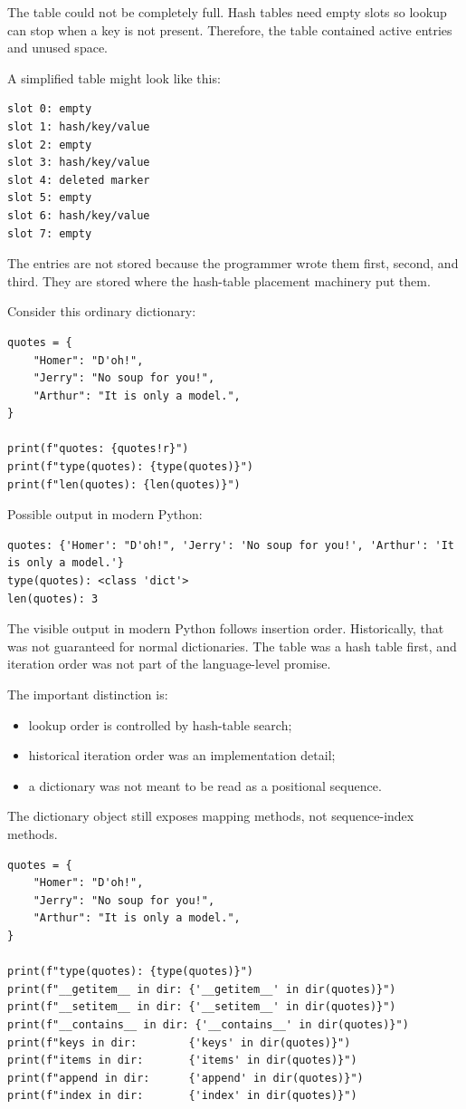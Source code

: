 The table could not be completely full. Hash tables need empty slots so lookup can stop when a key is not present. Therefore, the table contained active entries and unused space.

A simplified table might look like this:

\begin{verbatim}
slot 0: empty
slot 1: hash/key/value
slot 2: empty
slot 3: hash/key/value
slot 4: deleted marker
slot 5: empty
slot 6: hash/key/value
slot 7: empty
\end{verbatim}

The entries are not stored because the programmer wrote them first, second, and third. They are stored where the hash-table placement machinery put them.

Consider this ordinary dictionary:

\begin{verbatim}
quotes = {
    "Homer": "D'oh!",
    "Jerry": "No soup for you!",
    "Arthur": "It is only a model.",
}

print(f"quotes: {quotes!r}")
print(f"type(quotes): {type(quotes)}")
print(f"len(quotes): {len(quotes)}")
\end{verbatim}

Possible output in modern Python:

\begin{verbatim}
quotes: {'Homer': "D'oh!", 'Jerry': 'No soup for you!', 'Arthur': 'It is only a model.'}
type(quotes): <class 'dict'>
len(quotes): 3
\end{verbatim}

The visible output in modern Python follows insertion order. Historically, that was not guaranteed for normal dictionaries. The table was a hash table first, and iteration order was not part of the language-level promise.

The important distinction is:

\begin{itemize}
    \item lookup order is controlled by hash-table search;
    \item historical iteration order was an implementation detail;
    \item a dictionary was not meant to be read as a positional sequence.
\end{itemize}

The dictionary object still exposes mapping methods, not sequence-index methods.

\begin{verbatim}
quotes = {
    "Homer": "D'oh!",
    "Jerry": "No soup for you!",
    "Arthur": "It is only a model.",
}

print(f"type(quotes): {type(quotes)}")
print(f"__getitem__ in dir: {'__getitem__' in dir(quotes)}")
print(f"__setitem__ in dir: {'__setitem__' in dir(quotes)}")
print(f"__contains__ in dir: {'__contains__' in dir(quotes)}")
print(f"keys in dir:        {'keys' in dir(quotes)}")
print(f"items in dir:       {'items' in dir(quotes)}")
print(f"append in dir:      {'append' in dir(quotes)}")
print(f"index in dir:       {'index' in dir(quotes)}")
\end{verbatim}

